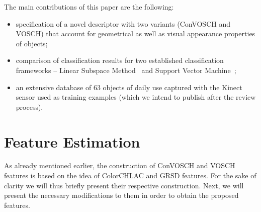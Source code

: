 \documentclass[conference]{sty/IEEEtran}
\begin{document}
The main contributions of this paper are the following:
\begin{itemize}
\item specification of a novel descriptor with two variants (ConVOSCH and VOSCH) that account for
geometrical as well as visual appearance  properties of objects;
\item comparison of classification results for two established classification
frameworks -- Linear Subspace Method~\cite{watanabe1973} and Support Vector Machine~\cite{svm99};
\item an extensive database of 63 objects of daily use captured with the Kinect sensor
used as training examples (which we intend to publish after the review process).
\end{itemize}

\section{Feature Estimation}
\label{sec:features}
As already mentioned earlier, the construction of ConVOSCH and VOSCH features is based on the idea of 
ColorCHLAC and GRSD features. For the sake of clarity we will thus briefly present
their respective construction.
Next, we will present the necessary modifications to them in order to obtain the proposed features.
\end{document}
